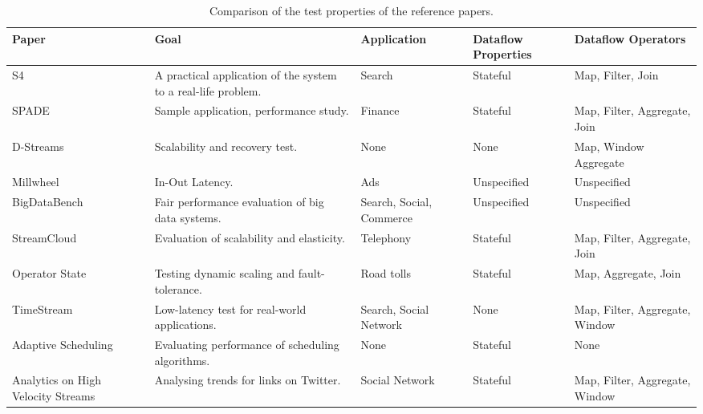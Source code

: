 \begin{table}[H]
  \centering
  {
    \scriptsize
    \hspace*{-1cm}
    \begin{tabular}{|p{3cm}|p{4cm}|p{3cm}|p{2.5cm}|p{2.5cm}|}
      \hline
      Paper & Goal & Application & Dataflow Properties & Dataflow Operators
      \\\hline
      
      S4\cite{s4}
      & A practical application of the system to a real-life problem.
      & Search
      & Stateful
      & Map, Filter, Join
      \\\hline
      
      SPADE\cite{spade}
      & Sample application, performance study.
      & Finance
      & Stateful
      & Map, Filter, Aggregate, Join
      \\\hline

      D-Streams\cite{discretized}
      & Scalability and recovery test.
      & None
      & None
      & Map, Window Aggregate
      \\\hline

      Millwheel\cite{millwheel}
      & In-Out Latency.
      & Ads
      & Unspecified
      & Unspecified
      \\\hline

      BigDataBench\cite{bigdatabench}
      & Fair performance evaluation of big data systems.
      & Search, Social, Commerce
      & Unspecified
      & Unspecified
      \\\hline

      StreamCloud\cite{streamcloud}
      & Evaluation of scalability and elasticity.
      & Telephony
      & Stateful
      & Map, Filter, Aggregate, Join
      \\\hline

      Operator State\cite{integrating}
      & Testing dynamic scaling and fault-tolerance.
      & Road tolls
      & Stateful
      & Map, Aggregate, Join
      \\\hline

      TimeStream\cite{timestream}
      & Low-latency test for real-world applications.
      & Search, Social Network
      & None
      & Map, Filter, Aggregate, Window
      \\\hline

      Adaptive Scheduling\cite{storm}
      & Evaluating performance of scheduling algorithms.
      & None
      & Stateful
      & None
      \\\hline

      Analytics on High Velocity Streams\cite{storm2}
      & Analysing trends for links on Twitter.
      & Social Network
      & Stateful
      & Map, Filter, Aggregate, Window
      \\\hline
    \end{tabular}
  }
  \caption{Comparison of the test properties of the reference papers.}
  \label{table:test-properties}
\end{table}

